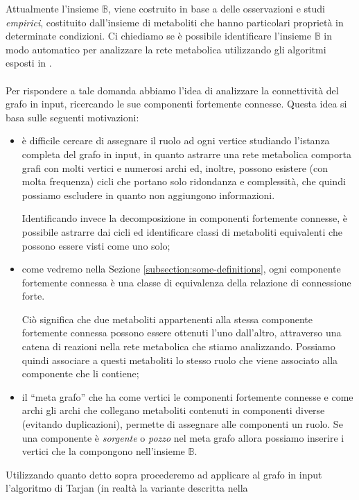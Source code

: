 Attualmente l'insieme $\mathbb{B}$, viene costruito in base a delle
osservazioni e studi \emph{empirici}, costituito dall'insieme di
metaboliti che hanno particolari propriet\`a in determinate
condizioni.  Ci chiediamo se \`e possibile identificare l'insieme
$\mathbb{B}$ in modo automatico per analizzare la rete metabolica
utilizzando gli algoritmi esposti in \cite{tellingStories}.
\\\\
Per rispondere a tale domanda abbiamo l'idea di analizzare la
connettivit\`a del grafo in input, ricercando le sue componenti
fortemente connesse. Questa idea si basa sulle seguenti motivazioni:
\begin{itemize}
\item \`e difficile cercare di assegnare il ruolo ad ogni vertice
  studiando l'istanza completa del grafo in input, in quanto astrarre
  una rete metabolica comporta grafi con molti vertici e numerosi
  archi ed, inoltre, possono esistere (con molta frequenza) cicli che
  portano solo ridondanza e complessit\`a, che quindi possiamo
  escludere in quanto non aggiungono informazioni.

  Identificando invece la decomposizione in componenti fortemente
  connesse, \`e possibile astrarre dai cicli ed identificare classi di
  metaboliti equivalenti che possono essere visti come uno solo;
\item come vedremo nella Sezione \ref{subsection:some-definitions},
  ogni componente fortemente connessa \`e una classe di equivalenza
  della relazione di connessione forte. 

  Ci\`o significa che due metaboliti appartenenti alla stessa
  componente fortemente connessa possono essere ottenuti l'uno
  dall'altro, attraverso una catena di reazioni nella rete metabolica
  che stiamo analizzando. Possiamo quindi associare a questi
  metaboliti lo stesso ruolo che viene associato alla componente che
  li contiene;
\item il ``meta grafo'' che ha come vertici le componenti fortemente
  connesse e come archi gli archi che collegano metaboliti contenuti
  in componenti diverse (evitando duplicazioni), permette di assegnare
  alle componenti un ruolo. Se una componente \`e \emph{sorgente} o
  \emph{pozzo} nel meta grafo allora possiamo inserire i vertici che
  la compongono nell'insieme $\mathbb{B}$.
\end{itemize}
Utilizzando quanto detto sopra procederemo ad applicare al grafo in
input l'algoritmo di Tarjan (in realt\`a la variante descritta nella
